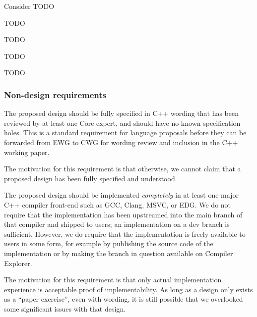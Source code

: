 Consider TODO





TODO


TODO


TODO


TODO



\subsubsection{Non-design requirements}


The proposed design should be fully specified in C++ wording that has been reviewed by at least one Core expert, and should have no known specification holes. This is a standard requirement for language proposals before they can be forwarded from EWG to CWG for wording review and inclusion in the C++ working paper. 

The motivation for this requirement is that otherwise, we cannot claim that a proposed design has been fully specified and understood.


The proposed design should be implemented \emph{completely} in at least one major C++ compiler front-end such as GCC, Clang, MSVC, or EDG. We do not require that the implementation has been upstreamed into the main branch of that compiler and shipped to users; an implementation on a dev branch is sufficient. However, we do require that the implementation is freely available to users in some form, for example by publishing the source code of the implementation or by making the branch in question available on Compiler Explorer.

The motivation for this requirement is that only actual implementation experience is acceptable proof of implementability. As long as a design only exists as a ``paper exercise'', even with wording, it is still possible that we overlooked some significant issues with that design.

